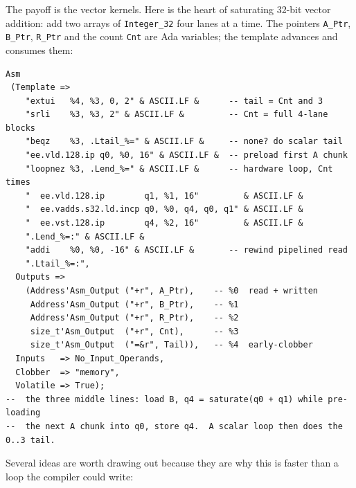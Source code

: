 The payoff is the vector kernels. Here is the heart of saturating 32-bit vector
addition: add two arrays of \texttt{Integer\_32} four lanes at a time. The
pointers \texttt{A\_Ptr}, \texttt{B\_Ptr}, \texttt{R\_Ptr} and the count
\texttt{Cnt} are Ada variables; the template advances and consumes them:

\begin{lstlisting}
Asm
 (Template =>
    "extui   %4, %3, 0, 2" & ASCII.LF &      -- tail = Cnt and 3
    "srli    %3, %3, 2" & ASCII.LF &         -- Cnt = full 4-lane blocks
    "beqz    %3, .Ltail_%=" & ASCII.LF &     -- none? do scalar tail
    "ee.vld.128.ip q0, %0, 16" & ASCII.LF &  -- preload first A chunk
    "loopnez %3, .Lend_%=" & ASCII.LF &      -- hardware loop, Cnt times
    "  ee.vld.128.ip        q1, %1, 16"         & ASCII.LF &
    "  ee.vadds.s32.ld.incp q0, %0, q4, q0, q1" & ASCII.LF &
    "  ee.vst.128.ip        q4, %2, 16"         & ASCII.LF &
    ".Lend_%=:" & ASCII.LF &
    "addi    %0, %0, -16" & ASCII.LF &       -- rewind pipelined read
    ".Ltail_%=:",
  Outputs =>
    (Address'Asm_Output ("+r", A_Ptr),    -- %0  read + written
     Address'Asm_Output ("+r", B_Ptr),    -- %1
     Address'Asm_Output ("+r", R_Ptr),    -- %2
     size_t'Asm_Output  ("+r", Cnt),      -- %3
     size_t'Asm_Output  ("=&r", Tail)),   -- %4  early-clobber
  Inputs   => No_Input_Operands,
  Clobber  => "memory",
  Volatile => True);
--  the three middle lines: load B, q4 = saturate(q0 + q1) while pre-loading
--  the next A chunk into q0, store q4.  A scalar loop then does the 0..3 tail.
\end{lstlisting}

Several ideas are worth drawing out because they are why this is faster than a
loop the compiler could write:

